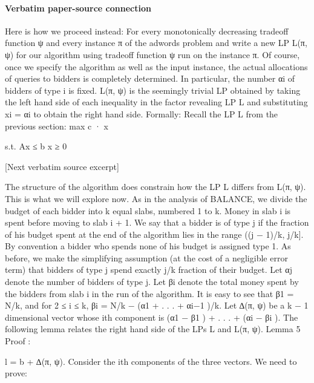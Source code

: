 \documentclass[10pt]{article}
\begin{document}
\paragraph{Verbatim paper-source connection}
\begin{ReviewVerbatim}
Here is how we proceed instead: For every monotonically decreasing tradeoff function ψ and
every instance π of the adwords problem and write a new LP L(π, ψ) for our algorithm using
tradeoff function ψ run on the instance π. Of course, once we specify the algorithm as well
as the input instance, the actual allocations of queries to bidders is completely determined.
In particular, the number αi of bidders of type i is fixed. L(π, ψ) is the seemingly trivial
LP obtained by taking the left hand side of each inequality in the factor revealing LP L and
substituting xi = αi to obtain the right hand side. Formally:
Recall the LP L from the previous section:
max c · x

s.t. Ax ≤ b x ≥ 0


[Next verbatim source excerpt]

The structure of the algorithm does constrain how the LP L differs from L(π, ψ). This is what
we will explore now.
As in the analysis of BALANCE, we divide the budget of each bidder into k equal slabs,
numbered 1 to k. Money in slab i is spent before moving to slab i + 1. We say that a bidder
is of type j if the fraction of his budget spent at the end of the algorithm lies in the range
((j − 1)/k, j/k]. By convention a bidder who spends none of his budget is assigned type 1. As
before, we make the simplifying assumption (at the cost of a negligible error term) that bidders
of type j spend exactly j/k fraction of their budget. Let αj denote the number of bidders of
type j. Let βi denote the total money spent by the bidders from slab i in the run of the
algorithm. It is easy to see that β1 = N/k, and for 2 ≤ i ≤ k, βi = N/k − (α1 + . . . + αi−1 )/k.
Let ∆(π, ψ) be a k − 1 dimensional vector whose ith component is (α1 − β1 ) + . . . + (αi − βi ).
The following lemma relates the right hand side of the LPs L and L(π, ψ).
Lemma 5
Proof :

l = b + ∆(π, ψ).
Consider the ith components of the three vectors. We need to prove:
\end{ReviewVerbatim}
\end{document}
